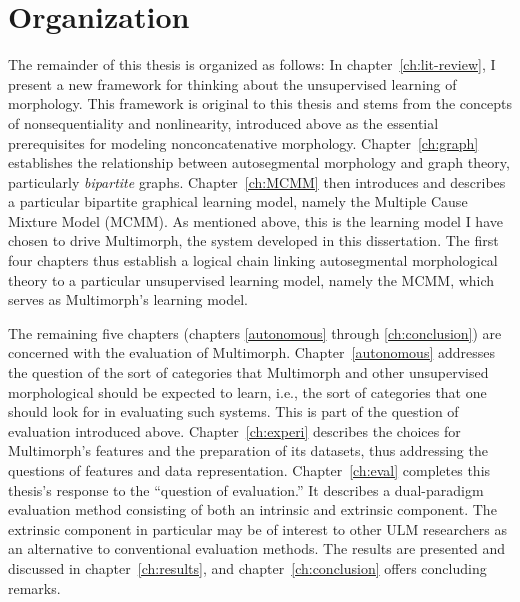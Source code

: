 \section{Organization}
The remainder of this thesis is organized as follows: In chapter~\ref{ch:lit-review}, 
I present a new framework for thinking about the unsupervised learning of morphology. 
This framework is original to this thesis and stems from the concepts of nonsequentiality 
and nonlinearity, introduced above as the essential prerequisites for modeling 
nonconcatenative morphology. Chapter~\ref{ch:graph} establishes the relationship 
between autosegmental morphology and graph theory, particularly \emph{bipartite} 
graphs. Chapter~\ref{ch:MCMM} then introduces and describes a particular bipartite 
graphical learning model, namely the Multiple Cause Mixture Model (MCMM). 
As mentioned above, this is the learning model I have chosen to drive Multimorph, 
the system developed in this dissertation. The first four chapters thus establish a logical 
chain linking autosegmental morphological theory to a particular unsupervised learning 
model, namely the MCMM, which serves as Multimorph's learning model. 

The remaining five chapters (chapters \ref{autonomous} through \ref{ch:conclusion}) 
are concerned with the evaluation of Multimorph. Chapter~\ref{autonomous} addresses 
the question of the sort of categories that Multimorph and other unsupervised morphological 
should be expected to learn, i.e., the sort of categories that one should look for in evaluating such 
systems. This is part of the question of evaluation introduced above. Chapter~\ref{ch:experi} 
describes the choices for Multimorph's features and the preparation of its datasets, thus addressing the questions of features and data representation.
 Chapter~\ref{ch:eval} completes this thesis's response to the 
``question of evaluation.'' It describes a dual-paradigm evaluation method consisting of 
both an intrinsic and extrinsic component. The extrinsic component in particular may be 
of interest to other ULM researchers as an alternative to conventional evaluation methods. 
The results are presented and discussed in chapter~\ref{ch:results}, and chapter~\ref{ch:conclusion} 
offers concluding remarks.